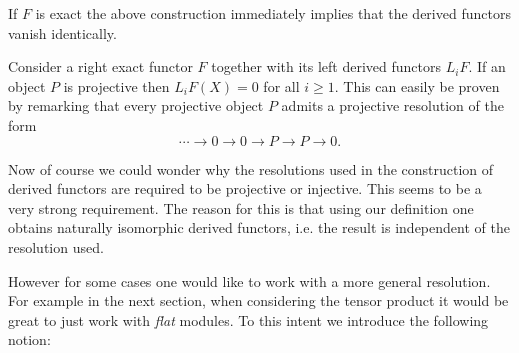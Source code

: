 
	\begin{property}
		If $F$ is exact the above construction immediately implies that the derived functors vanish identically.
	\end{property}

	\begin{property}\label{hom:projective_object}
		Consider a right exact functor $F$ together with its left derived functors $L_iF$. If an object $P$ is projective then $L_iF(X)=0$ for all $i\geq1$. This can easily be proven by remarking that every projective object $P$ admits a projective resolution of the form \[\cdots\longrightarrow0\longrightarrow0\longrightarrow P\longrightarrow P\longrightarrow0.\]
	\end{property}

	Now of course we could wonder why the resolutions used in the construction of derived functors are required to be projective or injective. This seems to be a very strong requirement. The reason for this is that using our definition one obtains naturally isomorphic derived functors, i.e. the result is independent of the resolution used.

	However for some cases one would like to work with a more general resolution. For example in the next section, when considering the tensor product it would be great to just work with \textit{flat} modules. To this intent we introduce the following notion:

